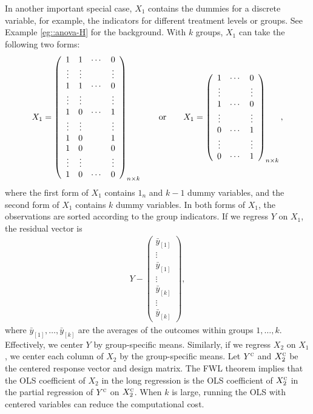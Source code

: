 In another important special case, $X_{1}$ contains the dummies for
a discrete variable, for example, the indicators for different treatment
levels or groups. 
See Example \ref{eg::anova-H} for the background. 
With $k$ groups, $X_{1}$ can take the following
two forms:
\begin{eqnarray}\label{eq::discrete-regressor-dummy}
X_{1}=\left(\begin{array}{cccc}
1 & 1 & \cdots & 0\\
\vdots & \vdots &  & \vdots\\
1 & 1 & \cdots & 0\\
\vdots & \vdots &  & \vdots\\
1 & 0 & \cdots & 1\\
\vdots & \vdots &  & \vdots\\
1 & 0 &  & 1\\
1 & 0 &  & 0\\
\vdots & \vdots &  & \vdots\\
1 & 0 & \cdots & 0
\end{array}\right)_{n\times k}\qquad\text{or}\qquad X_{1}=\left(\begin{array}{ccc}
1 & \cdots & 0\\
\vdots &  & \vdots\\
1 & \cdots & 0\\
\vdots &  & \vdots\\
0 & \cdots & 1\\
\text{\ensuremath{\vdots}} &  & \vdots\\
0 & \cdots & 1
\end{array}\right)_{n\times k},
\end{eqnarray}
where the first form of $X_1$ contains $1_{n}$ and $k-1$ dummy variables,
and the second form of $X_1$ contains $k$ dummy variables. In both forms
of $X_{1}$, the observations are sorted according to the group indicators.
If we regress $Y$ on $X_{1}$, the residual vector is 
\begin{eqnarray}\label{eq::centeringbyK}
Y - 
\left(\begin{array}{c}
 \bar{y}_{[1]}\\
\vdots\\
 \bar{y}_{[1]}\\
\vdots\\
 \bar{y}_{[k]}\\
\vdots\\
 \bar{y}_{[k]}
\end{array}\right),
\end{eqnarray}
where $\bar{y}_{[1]},\ldots,\bar{y}_{[k]}$ are the averages of the
outcomes within groups $1,\ldots,k$. Effectively, we center $Y$ by
group-specific means. Similarly, if we regress $X_{2}$ on $X_{1}$,
we center each column of $X_{2}$ by the group-specific means. Let
$Y^{\textsc{c}}$ and $X_{2}^{\textsc{c}}$ be the centered response
vector and design matrix. The FWL theorem implies that the OLS coefficient
of $X_{2}$ in the long regression is the OLS coefficient of $X_{2}^{\textsc{c}}$
in the partial regression of $Y^{\textsc{c}}$ on $X_{2}^{\textsc{c}}$.
When $k$ is large, running the OLS with centered variables can reduce
the computational cost. 




